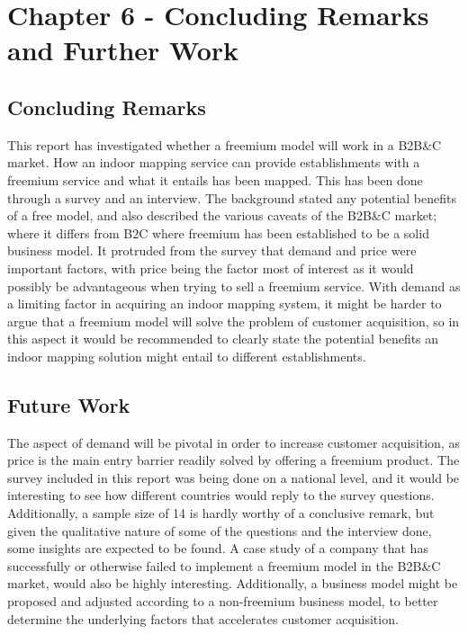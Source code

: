 \chapter{Chapter 6 - Concluding Remarks and Further Work}
\section{Concluding Remarks}
This report has investigated whether a freemium model will work in a B2B\&C market. How an indoor mapping service can provide establishments with a freemium service and what it entails has been mapped. This has been done through a survey and an interview. The background stated any potential benefits of a free model, and also described the various caveats of the B2B\&C market; where it differs from B2C where freemium has been established to be a solid business model. It protruded from the survey that demand and price were important factors, with price being the factor most of interest as it would possibly be advantageous when trying to sell a freemium service. With demand as a limiting factor in acquiring an indoor mapping system, it might be harder to argue that a freemium model will solve the problem of customer acquisition, so in this aspect it would be recommended to clearly state the potential benefits an indoor mapping solution might entail to different establishments.


\section{Future Work}
The aspect of demand will be pivotal in order to increase customer acquisition, as price is the main entry barrier readily solved by offering a freemium product. The survey included in this report was being done on a national level, and it would be interesting to see how different countries would reply to the survey questions. Additionally, a sample size of 14 is hardly worthy of a conclusive remark, but given the qualitative nature of some of the questions and the interview done, some insights are expected to be found. A case study of a company that has successfully or otherwise failed to implement a freemium model in the B2B\&C market, would also be highly interesting. Additionally, a business model might be proposed and adjusted according to a non-freemium business model, to better determine the underlying factors that accelerates customer acquisition.

